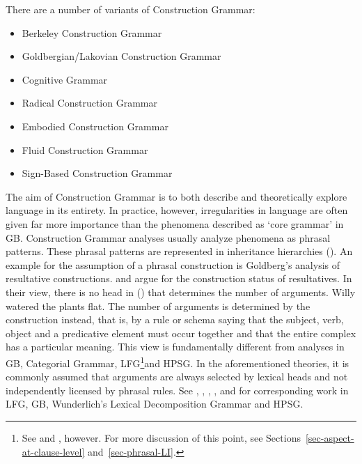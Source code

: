 There are a number of variants of Construction Grammar:
\begin{sloppypar}
\begin{itemize}
\item Berkeley Construction Grammar \citep{Fillmore88a,KF99a,FriedHSK}
\item Goldbergian/Lakovian Construction Grammar \citep{Lakoff87a-u,Goldberg95a,Goldberg2006a}
\item Cognitive Grammar \citep{Langacker87a-u,Langacker2000a,Langacker2008a-u,Dabrowska2004a}
\item Radical Construction Grammar \citep{Croft2001a}
\item Embodied Construction Grammar \citep{BC2005a}
\item Fluid Construction Grammar \citep{SDB2006a-u,SteelsFluid-ed}
\item Sign-Based Construction Grammar \citep{Sag2010b,Sag2012a}
\end{itemize}
\end{sloppypar}

\noindent
The aim of Construction Grammar is to both describe and theoretically explore language in its entirety.
In practice, however, irregularities in language are often given far more importance than the phenomena described
as `core grammar' in GB. Construction Grammar analyses usually analyze phenomena as phrasal patterns.
These phrasal patterns are represented in inheritance hierarchies (\eg \citealp{Croft2001a,Goldberg2003a}).
%
An example for the assumption of a phrasal construction is Goldberg's analysis of resultative constructions.
\citet{Goldberg95a} and \citet{GJ2004a} argue for the construction status of resultatives. In their view, there is no head
in () that determines the number of arguments.
\ea
Willy watered the plants flat.
\z
The number of arguments is determined by the construction instead, that is, by a rule or schema saying that the subject, verb, object and a predicative
element must occur together and that the entire complex has a particular meaning. This view is fundamentally different from analyses in GB\indexgb,
Categorial Grammar\indexcg, LFG\footnote{%
	See  and , however. For more discussion of this point, see
        Sections~\ref{sec-aspect-at-clause-level} and~\ref{sec-phrasal-LI}.%
}\indexlfg and HPSG\indexhpsg.
In the aforementioned theories, it is commonly assumed that arguments are always selected by lexical heads and not independently licensed by phrasal
rules. See , , , , and
 for corresponding work in LFG, GB, Wunderlich's
Lexical Decomposition Grammar and HPSG. 

